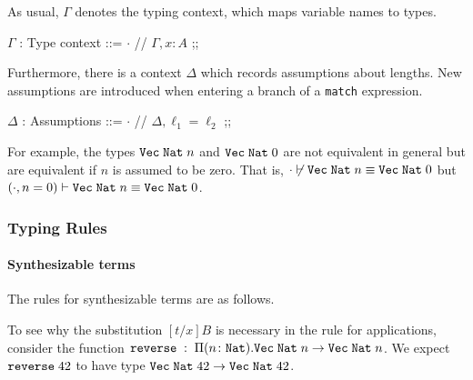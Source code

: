 \documentclass[acmsmall,nonacm]{acmart}
\begin{document}
\noindent
As usual, $\Gamma$ denotes the typing context, which maps variable names to types.

\begin{center}
\begin{bnf}
    $\Gamma$ : Type context ::= $\cdot$ // $\Gamma , x \colon A$ ;;
\end{bnf}
\end{center}

\noindent
Furthermore, there is a context $\Delta$ which records assumptions about lengths.
New assumptions are introduced when entering a branch of a \texttt{match} expression.

\begin{center}
\begin{bnf}
    $\Delta$ : Assumptions ::= $\cdot$ // $\Delta , \ell_1 = \ell_2$ ;;
\end{bnf}
\end{center}

\noindent
For example, the types $\texttt{Vec} \; \texttt{Nat} \; n$ and $\texttt{Vec} \; \texttt{Nat} \; 0$ are not equivalent in general but are equivalent if $n$ is assumed to be zero.
That is, $\cdot \not\vdash \texttt{Vec} \; \texttt{Nat} \; n \equiv \texttt{Vec} \; \texttt{Nat} \; 0$ but $(\cdot,n=0) \vdash \texttt{Vec} \; \texttt{Nat} \; n \equiv \texttt{Vec} \; \texttt{Nat} \; 0$.

\subsubsection{Typing Rules}
\label{sec:typing-rules}

\paragraph{Synthesizable terms}
The rules for synthesizable terms are as follows.
\begin{inferences}
    \qquad {}
\end{inferences}

\noindent
To see why the substitution $[t/x] B$ is necessary in the rule for applications, consider the function $\texttt{reverse} \; : \; \Pi (n \colon \texttt{Nat}) . \texttt{Vec} \; \texttt{Nat} \; n \rightarrow \texttt{Vec} \; \texttt{Nat} \; n$.
We expect $\texttt{reverse} \; 42$ to have type $\texttt{Vec} \; \texttt{Nat} \; 42 \rightarrow \texttt{Vec} \; \texttt{Nat} \; 42$.
\end{document}
